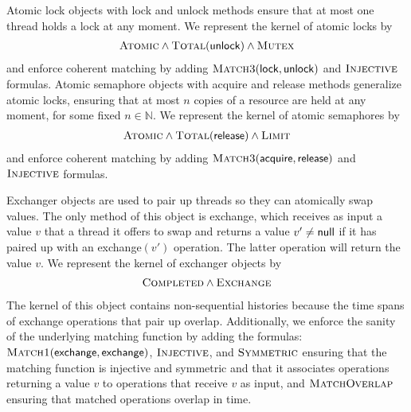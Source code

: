 \begin{example}

  Atomic lock objects with {\sf lock} and {\sf unlock} methods ensure that at
  most one thread holds a lock at any moment. We represent the kernel of atomic
  locks by
  \begin{align*}
    \textsc{Atomic} \land \textsc{Total}({\sf unlock}) \land \textsc{Mutex}
  \end{align*}
  and enforce coherent matching by adding $\textsc{Match3}({\sf lock, unlock})$
  and $\textsc{Injective}$ formulas. Atomic semaphore objects with acquire and
  release methods generalize atomic locks, ensuring that at most $n$ copies of
  a resource are held at any moment, for some fixed $n \in \mathbb{N}$. We
  represent the kernel of atomic semaphores by
  \begin{align*}
    \textsc{Atomic} \land \textsc{Total}({\sf release}) \land \textsc{Limit}
  \end{align*}
  and enforce coherent matching by adding $\textsc{Match3}({\sf acquire,
  release})$ and $\textsc{Injective}$ formulas.
  
  Exchanger objects are used to pair up threads so they can atomically swap
  values. The only method of this object is exchange, which receives as
  input a value $v$ that a thread it offers to swap and returns a value $v'\neq
  {\sf null}$ if it has paired up with an exchange$(v')$ operation. The latter
  operation will return the value $v$. We represent the kernel of exchanger
  objects by
  \begin{align*}
     \textsc{Completed} \land \textsc{Exchange}
  \end{align*}
  The kernel of this object contains non-sequential histories
  because the time spans of exchange
  operations that pair up overlap.
  Additionally, we enforce the sanity of the underlying matching function by
  adding the formulas: $\textsc{Match1}({\sf exchange},{\sf
  exchange})$, $\textsc{Injective}$, and $\textsc{Symmetric}$
  ensuring that the matching function is injective and symmetric and that it
  associates operations returning a value $v$ to operations that receive $v$
  as input, and $\textsc{MatchOverlap}$ ensuring that matched operations
  overlap in time.
  
\end{example}

